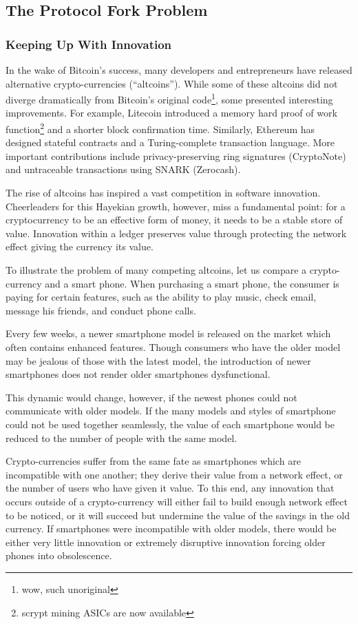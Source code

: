\documentclass[letterpaper]{article}
\begin{document}
\subsection{The Protocol Fork Problem}

\subsubsection{Keeping Up With Innovation}
In the wake of Bitcoin's success, many developers and entrepreneurs have
released alternative crypto-currencies (``altcoins''). While some of these
altcoins did not diverge dramatically from Bitcoin's original
code\footnote{wow, such unoriginal}, some presented interesting improvements.
For example, Litecoin introduced a memory hard proof of work
function\footnote{scrypt mining ASICs are now available} and a shorter block
confirmation time. Similarly, Ethereum has designed
stateful contracts and a Turing-complete transaction language\cite{Ethereum}.
More important contributions include privacy-preserving ring signatures
(CryptoNote)\cite{CryptoNote} and untraceable transactions using SNARK
(Zerocash)\cite{Zerocash}.

The rise of altcoins has inspired a vast competition in software innovation.
Cheerleaders for this Hayekian growth, however, miss a fundamental point: for a
cryptocurrency to be an effective form of money, it needs to be a stable store
of value. Innovation within a ledger preserves value through protecting
the network effect giving the currency its value.

To illustrate the problem of many competing altcoins, let us compare a
crypto-currency and a smart phone. When purchasing a smart phone, the consumer
is paying for certain features, such as the ability to play music, check email,
message his friends, and conduct phone calls.

Every few weeks, a newer smartphone model is released on the market which often
contains enhanced features. Though consumers who have the older model may be
jealous of those with the latest model, the introduction of newer smartphones
does not render older smartphones dysfunctional.

This dynamic would change, however, if the newest phones could not communicate
with older models. If the many models and styles of smartphone could not be used
together seamlessly, the value of each smartphone would be reduced to the number
of people with the same model.

Crypto-currencies suffer from the same fate as smartphones which are
incompatible with one another; they derive their value from a network effect,
or the number of users who have given it value. To this end, any innovation that
occurs outside of a crypto-currency will either fail to build enough network
effect to be noticed, or it will succeed but undermine the value of the savings
in the old currency. If smartphones were incompatible with older models, there
would be either very little innovation or extremely disruptive innovation
forcing older phones into obsolescence.
\end{document}
